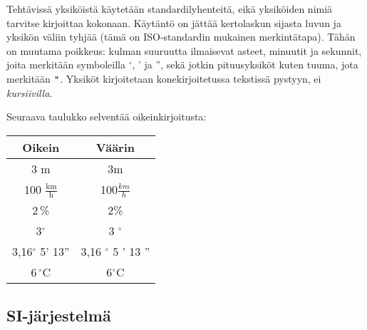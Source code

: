 
Tehtävissä yksiköistä käytetään standardilyhenteitä, eikä yksiköiden nimiä tarvitse kirjoittaa kokonaan. Käytäntö on jättää kertolaskun sijasta luvun ja yksikön väliin tyhjää (tämä on ISO-standardin mukainen merkintätapa). %
Tähän on muutama poikkeus: kulman suuruutta ilmaisevat asteet, minuutit ja sekunnit, joita merkitään symboleilla $^\circ$, ' ja '', sekä jotkin pituusyksiköt kuten tuuma, jota merkitään ${\verb+"+}$. Yksiköt kirjoitetaan konekirjoitetussa tekstissä pystyyn, ei \textit{kursiivilla}.



Seuraava taulukko selventää oikeinkirjoitusta:

\begin{center}
\begin{tabular}{c|c}
Oikein & Väärin \\
\hline
3 m & 3m 	\\
100 $\frac{\text{km}}{\text{h}}$ & 100$\frac{km}{h}$	\\
2\,\% & 2\% 	\\
3$^\circ$ & 3 $^\circ$\\
3,16$^\circ$ 5' 13'' & 3,16 $^\circ$ 5 ' 13 '' 	\\
6\,$^\circ$C & 6$^\circ$C 	\\
\end{tabular}
\end{center}


\subsection*{SI-järjestelmä}

